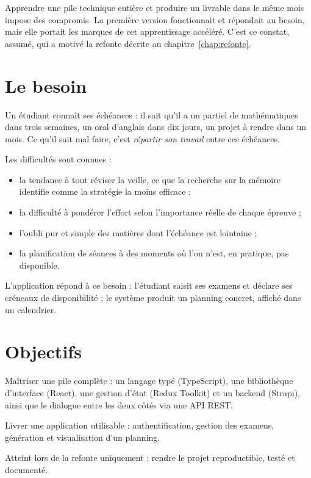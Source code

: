 \documentclass[11pt,a4paper]{report}
\begin{document}
Apprendre une pile technique entière et produire un livrable dans le même mois
impose des compromis. La première version fonctionnait et répondait au besoin,
mais elle portait les marques de cet apprentissage accéléré. C'est ce constat,
assumé, qui a motivé la refonte décrite au chapitre~\ref{chap:refonte}.

\section{Le besoin}

Un étudiant connaît ses échéances : il sait qu'il a un partiel de mathématiques
dans trois semaines, un oral d'anglais dans dix jours, un projet à rendre dans
un mois. Ce qu'il sait mal faire, c'est \emph{répartir son travail} entre ces
échéances.

Les difficultés sont connues :

\begin{itemize}[nosep]
  \item la tendance à tout réviser la veille, ce que la recherche sur la mémoire
        identifie comme la stratégie la moins efficace ;
  \item la difficulté à pondérer l'effort selon l'importance réelle de chaque
        épreuve ;
  \item l'oubli pur et simple des matières dont l'échéance est lointaine ;
  \item la planification de séances à des moments où l'on n'est, en pratique,
        pas disponible.
\end{itemize}

L'application répond à ce besoin : l'étudiant saisit ses examens et déclare ses
créneaux de disponibilité ; le système produit un planning concret, affiché dans
un calendrier.

\section{Objectifs}

\begin{description}[style=nextline,leftmargin=0.6cm]
  \item[Objectif pédagogique] Maîtriser une pile complète : un langage typé
        (TypeScript), une bibliothèque d'interface (React), une gestion d'état
        (Redux Toolkit) et un backend (Strapi), ainsi que le dialogue entre les
        deux côtés via une API REST.
  \item[Objectif fonctionnel] Livrer une application utilisable : authentification,
        gestion des examens, génération et visualisation d'un planning.
  \item[Objectif de qualité] Atteint lors de la refonte uniquement : rendre le
        projet reproductible, testé et documenté.
\end{description}
\end{document}
